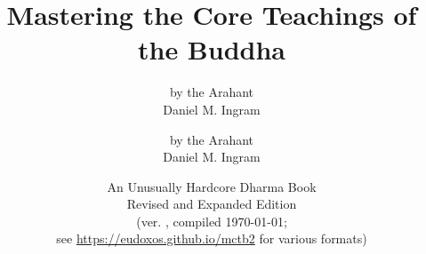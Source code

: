 

\ifplastex\else
	\usepackage{newunicodechar}
	\usepackage[weather]{ifsym}
\fi

\def\vismAssertFootnoteCounter#1{\relax}

	\title{Mastering the Core Teachings of the Buddha}
	\date{An Unusually Hardcore Dharma Book \\ Revised and Expanded Edition \\ (ver. \vismCommitHref, compiled \today; \\ see \url{https://eudoxos.github.io/mctb2} for various formats)}
	\ifplastex
		\author{by the Arahant \\ Daniel M. Ingram}
	\else
		\author{by the Arahant \\ Daniel M. Ingram}
	\fi
	\maketitle

	\frontmatter
		\renewcommand{\thechapter}{\arabic{chapter}}

		\bgroup
			\ifplastex\else\renewcommand{\baselinestretch}{0.2}\normalsize\fi
			\tableofcontents
		\egroup
		

